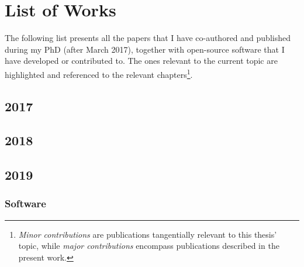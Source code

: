 \chapter{List of Works}%
\label{ch:all-works}

The following list presents all the papers that I have co-authored and published
during my PhD (after March 2017),
together with open-source software that I have developed or contributed to.
The ones relevant to the current topic are highlighted and referenced to
the relevant chapters\footnote{\emph{Minor contributions} are publications
	tangentially relevant to this thesis' topic, while \emph{major contributions}
	encompass publications described in the present work.}.

\section*{2017}

\section*{2018}

\section*{2019}

\subsection*{Software}

